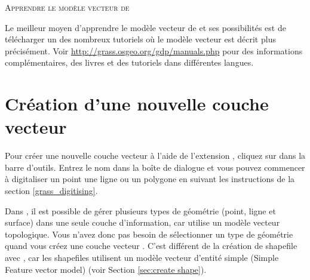 \begin{Tip}\caption{\textsc{Apprendre le modèle vecteur de \grass}}
Le meilleur moyen d'apprendre le modèle vecteur de \grass et ses possibilités est de télécharger un des nombreux tutoriels \grass où le modèle vecteur est décrit plus précisément. Voir \url{http://grass.osgeo.org/gdp/manuals.php} pour des informations complémentaires, des livres et des tutoriels dans différentes langues.
\end{Tip} 

\section{Création d'une nouvelle couche vecteur \grass}\label{sec:creating_new_grass_vectors}

Pour créer une nouvelle couche vecteur \grass à l'aide de l'extension \grass, cliquez sur  dans la barre d'outils. Entrez le nom dans la boîte de dialogue et vous pouvez commencer à digitaliser un point une ligne ou un polygone en suivant les instructions de la section \ref{grass_digitising}.

Dans \grass, il est possible de gérer plusieurs types de géométrie (point, ligne et surface) dans une seule couche d'information, car \grass utilise un modèle vecteur topologique. Vous n'avez donc pas besoin de sélectionner un type de géométrie quand vous créez une couche vecteur \grass. C'est différent de la création de shapefile avec \qg, car les shapefiles utilisent un modèle vecteur d'entité simple (Simple Feature vector model) (voir Section \ref{sec:create shape}).


